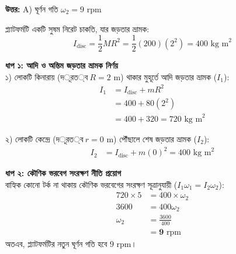 \documentclass[12pt, a4paper]{article}
\begin{document}
\vspace{0.5em}
\begin{tcolorbox}[answerbox]
\textbf{\color{success} উত্তর:} A) ঘূর্ণন গতি $\omega_2 = 9\text{ rpm}$
\end{tcolorbox}
\vspace{1em}

\begin{tcolorbox}[solutionbox={সমাধান (Solution)}]
\noindent
প্ল্যাটফর্মটি একটি সুষম নিরেট চাকতি, যার জড়তার ভ্রামক:
\[I_{\text{disc}} = \frac{1}{2} M R^2 = \frac{1}{2} (200) (2^2) = 400\text{ kg m}^2\]

\textbf{ধাপ ১: আদি ও অন্তিম জড়তার ভ্রামক নির্ণয়} \\
১) লোকটি কিনারায় ($দূরত্ব\ R = 2\text{ m}$) থাকার মুহূর্তে আদি জড়তার ভ্রামক ($I_1$):
\begin{align*}
    I_1 &= I_{\text{disc}} + m R^2 \\
        &= 400 + 80 (2^2) \\
        &= 400 + 320 = 720\text{ kg m}^2
\end{align*}

২) লোকটি কেন্দ্রে ($দূরত্ব\ r = 0\text{ m}$) পৌঁছালে শেষ জড়তার ভ্রামক ($I_2$):
\begin{align*}
    I_2 &= I_{\text{disc}} + m (0)^2 = 400\text{ kg m}^2
\end{align*}

\vspace{0.5em}
\textbf{ধাপ ২: কৌণিক ভরবেগ সংরক্ষণ নীতি প্রয়োগ} \\
বাহ্যিক কোনো টর্ক না থাকায় কৌণিক ভরবেগের সংরক্ষণ সূত্রানুযায়ী ($I_1 \omega_1 = I_2 \omega_2$):
\begin{align*}
    720 \times 5 &= 400 \times \omega_2 \\
    3600 &= 400 \omega_2 \\
    \omega_2 &= \frac{3600}{400} \\
    &= \mathbf{9}\text{ rpm}
\end{align*}
অতএব, প্ল্যাটফর্মটির নতুন ঘূর্ণন গতি হবে $9\text{ rpm}$।
\end{tcolorbox}
\end{document}
